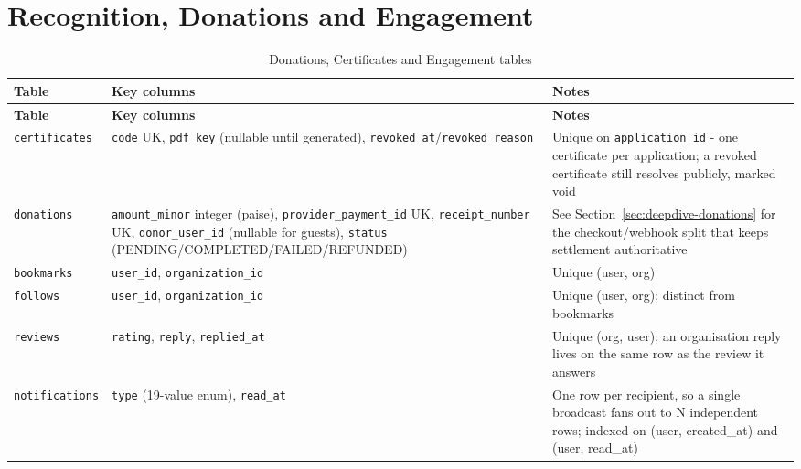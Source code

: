 \section{Recognition, Donations and Engagement}
\begin{longtable}{|>{\raggedright\arraybackslash}p{}|>{\raggedright\arraybackslash}p{}|>{\raggedright\arraybackslash}p{}|}
\caption{Donations, Certificates and Engagement tables}\\\hline
\textbf{Table} & \textbf{Key columns} & \textbf{Notes}\\\hline
\endfirsthead\hline\textbf{Table} & \textbf{Key columns} & \textbf{Notes}\\\hline\endhead
\texttt{certificates} & \texttt{code} UK, \texttt{pdf\_key} (nullable until generated), \texttt{revoked\_at}/\allowbreak\texttt{revoked\_reason} & Unique on \texttt{application\_id} - one certificate per application; a revoked certificate still resolves publicly, marked void\\\hline
\texttt{donations} & \texttt{amount\_minor} integer (paise), \texttt{provider\_\allowbreak payment\_id} UK, \texttt{receipt\_number} UK, \texttt{donor\_user\_id} (nullable for guests), \texttt{status} (PENDING/\allowbreak COMPLETED/\allowbreak FAILED/\allowbreak REFUNDED) & See Section~\ref{sec:deepdive-donations} for the checkout/webhook split that keeps settlement authoritative\\\hline
\texttt{bookmarks} & \texttt{user\_id}, \texttt{organization\_id} & Unique (user, org)\\\hline
\texttt{follows} & \texttt{user\_id}, \texttt{organization\_id} & Unique (user, org); distinct from bookmarks\\\hline
\texttt{reviews} & \texttt{rating}, \texttt{reply}, \texttt{replied\_at} & Unique (org, user); an organisation reply lives on the same row as the review it answers\\\hline
\texttt{notifications} & \texttt{type} (19-value enum), \texttt{read\_at} & One row per recipient, so a single broadcast fans out to N independent rows; indexed on (user, created\_at) and (user, read\_at)\\\hline
\end{longtable}

